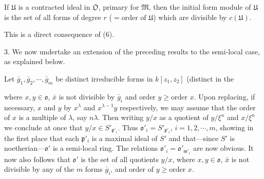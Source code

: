 If $\mathfrak{U}$ is a contracted ideal in $\mathfrak{O}$, primary for $\mathfrak{M}$, then the initial form module of $\mathfrak{U}$ is the set of all forms of degree $r$ ($= \text{order of } \mathfrak{U}$) which are divisible by $c(\mathfrak{U})$.

This is a direct consequence of (6).

3. We now undertake an extension of the preceding results to the semi-local case, as explained below.

Let $\bar{g}_1, \bar{g}_2, \cdots, \bar{g}_m$ be distinct irreducible forms in $k[z_1, z_2]$ (distinct in the

where $x, y \in \mathfrak{o}$, $\bar{x}$ is not divisible by $\bar{g}_i$ and order $y \geq \text{order } x$. Upon replacing, if necessary, $x$ and $y$ by $x^\lambda$ and $x^{\lambda-1}y$ respectively, we may assume that the order of $x$ is a multiple of $\lambda$, say $n\lambda$. Then writing $y/x$ as a quotient of $y/\xi^n$ and $x/\xi^n$ we conclude at once that $y/x \in S'_{\mathfrak{p}'_i}$. Thus $\mathfrak{o}'_i = S'_{\mathfrak{p}'_i}$, $i = 1, 2, \cdots, m$, showing in the first place that each $\mathfrak{p}'_i$ is a maximal ideal of $S'$ and that—since $S'$ is noetherian—$\mathfrak{o}'$ is a semi-local ring. The relations $\mathfrak{o}'_i = \mathfrak{o}'_{\mathfrak{m}'_i}$ are now obvious. It now also follows that $\mathfrak{o}'$ is the set of all quotients $y/x$, where $x, y \in \mathfrak{o}$, $\bar{x}$ is not divisible by any of the $m$ forms $\bar{g}_i$, and order of $y \geq \text{order } x$.